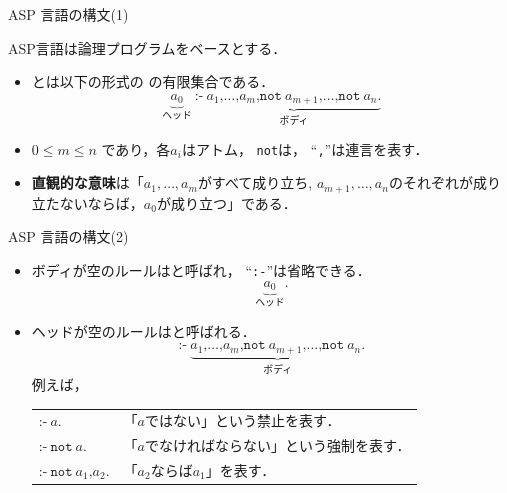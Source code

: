 \documentclass[dvipdfmx,11pt]{beamer}
\begin{document}
\begin{frame}{ASP 言語の構文(1)}
  \begin{alertblock}{}\centering
    ASP言語は論理プログラムをベースとする\footnotemark[1]．
  \end{alertblock}
\begin{itemize}
\item {}とは以下の形式の
  の有限集合である．
  \[
    \underbrace{a_0}_{\textrm{ヘッド}}\ \texttt{:-}\
    \underbrace{a_1\texttt{,}\dots\texttt{,}a_m\texttt{,}
      \texttt{not}\ {a_{m+1}}\texttt{,}\dots\texttt{,}
      \texttt{not}\ {a_n}\texttt{.}}_{\textrm{ボディ}}
  \]
\item $0\leq m\leq n$ であり，各$a_i$はアトム，
  \texttt{not}は，
  ``\texttt{,}''は連言を表す．
\item \alert{\bf 直観的な意味}は「$a_1,\ldots,a_m$がすべて成り立ち,
  $a_{m+1},\ldots,a_n$のそれぞれが成り立たないならば，$a_0$が成り立つ」である．
\end{itemize}
\end{frame}
\begin{frame}{ASP 言語の構文(2)}
\begin{itemize}
\item ボディが空のルールはと呼ばれ，
  ``\texttt{:-}''は省略できる．
  \[
    \underbrace{a_0}_{\textrm{ヘッド}}\texttt{.}
  \]
\item ヘッドが空のルールはと呼ばれる．
  \[
    \texttt{:-}\
    \underbrace{a_1\texttt{,}\dots\texttt{,}a_m\texttt{,}
      \texttt{not}\ {a_{m+1}}\texttt{,}\dots\texttt{,}
      \texttt{not}\ {a_n}\texttt{.}}_{\textrm{ボディ}}
  \]
  例えば，\\[1em]
  \begin{tabular}[t]{l|l}
    \(\texttt{:-}\ a\texttt{.}\) &
   「$a$ではない」という禁止を表す．\\
    \(\texttt{:-}\ \texttt{not}\ a\texttt{.}\) &
   「$a$でなければならない」という強制を表す．\\
    \(\texttt{:-}\ \texttt{not}\ a_1\texttt{,} {a_{2}}\texttt{.}\)&
  「$a_2$ならば$a_1$」を表す．
  \end{tabular}
\end{itemize}
\end{frame}
\end{document}
